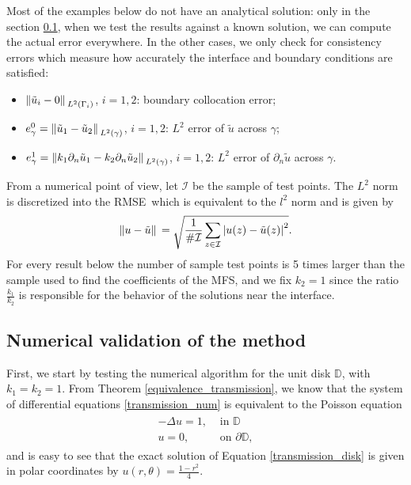 Most of the examples below do not have an analytical solution: only in the section \ref{transmission_val_subsection}, when we test the results against a known solution, we can compute the actual error everywhere. In the other cases, we only check for consistency errors which measure how accurately the interface and boundary conditions are satisfied:
\begin{itemize}
    \item \(\norm*{\tilde{u}_i - 0}_{L^2(\Gamma_i)}\), \(i=1, 2\): boundary collocation error;
    \item \(e_\gamma^0 = \norm*{\tilde{u}_1 - \tilde{u}_2}_{L^2(\gamma)}\), \(i=1, 2\): \(L^2\) error of \(\tilde{u}\) across \(\gamma\);
    \item \(e_\gamma^1 = \norm*{k_1 \partial_n\tilde{u}_1 - k_2 \partial_n\tilde{u}_2}_{L^2(\gamma)}\), \(i=1, 2\): \(L^2\) error of \(\partial_n\tilde{u}\) across \(\gamma\).
\end{itemize}
From a numerical point of view, let \(\mathcal{I}\) be the sample of test points. The \(L^2\) norm is discretized into the \ac{RMSE}\ which is equivalent to the \(l^2\) norm and is given by
\[
    \norm*{u-\tilde{u}}= \sqrt{\frac{1}{\#\mathcal{I}} \sum_{z \in \mathcal{I}} \abs{u(z)-\tilde{u}(z)}^2}.
\]
For every result below the number of sample test points is 5 times larger than the sample used to find the coefficients of the \ac{MFS}, and we fix \(k_2=1\) since the ratio \(\frac{k_1}{k_2}\) is responsible for the behavior of the solutions near the interface. 

\subsection{Numerical validation of the method}\label{transmission_val_subsection}

First, we start by testing the numerical algorithm for the unit disk \(\mathbb{D}\), with \(k_1=k_2=1\). From Theorem \ref{equivalence_transmission}, we know that the system of differential equations \eqref{transmission_num} is equivalent to the Poisson equation
\begin{align}\label{transmission_disk}
    \begin{split}
        -\Delta u = 1, & \text{ in } \mathbb{D}\\
        u = 0, & \text{ on } \partial\mathbb{D},
    \end{split}
\end{align}
and is easy to see that the exact solution of Equation \eqref{transmission_disk} is given in polar coordinates by \(u(r, \theta) = \frac{1-r^2}{4}\). 

